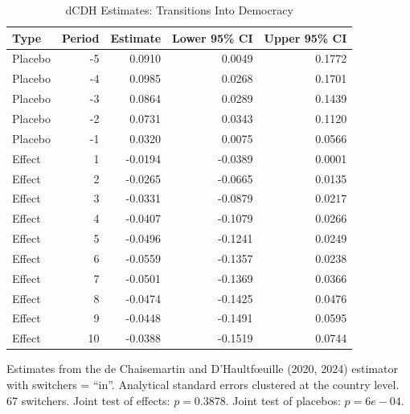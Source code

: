 \begin{table}[H]
\centering
\caption{\label{tab:dcdh-in-table}dCDH Estimates: Transitions Into Democracy}
\centering
\begin{threeparttable}
\begin{tabular}[t]{lrrrr}
\toprule
Type & Period & Estimate & Lower 95\% CI & Upper 95\% CI\\
\midrule
Placebo & -5 & 0.0910 & 0.0049 & 0.1772\\
Placebo & -4 & 0.0985 & 0.0268 & 0.1701\\
Placebo & -3 & 0.0864 & 0.0289 & 0.1439\\
Placebo & -2 & 0.0731 & 0.0343 & 0.1120\\
Placebo & -1 & 0.0320 & 0.0075 & 0.0566\\
\addlinespace
Effect & 1 & -0.0194 & -0.0389 & 0.0001\\
Effect & 2 & -0.0265 & -0.0665 & 0.0135\\
Effect & 3 & -0.0331 & -0.0879 & 0.0217\\
Effect & 4 & -0.0407 & -0.1079 & 0.0266\\
Effect & 5 & -0.0496 & -0.1241 & 0.0249\\
\addlinespace
Effect & 6 & -0.0559 & -0.1357 & 0.0238\\
Effect & 7 & -0.0501 & -0.1369 & 0.0366\\
Effect & 8 & -0.0474 & -0.1425 & 0.0476\\
Effect & 9 & -0.0448 & -0.1491 & 0.0595\\
Effect & 10 & -0.0388 & -0.1519 & 0.0744\\
\bottomrule
\end{tabular}
\begin{tablenotes}
\item Estimates from the de Chaisemartin and D'Haultf\oe uille (2020, 2024) estimator with switchers = ``in''. Analytical standard errors clustered at the country level. 67 switchers. Joint test of effects: $p = 0.3878$. Joint test of placebos: $p = 6e-04$.
\end{tablenotes}
\end{threeparttable}
\end{table}
